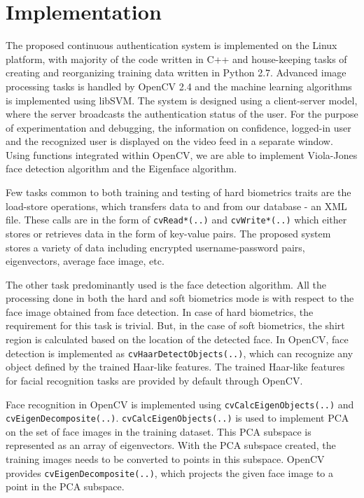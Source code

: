 \documentclass[%
        final,
        internal,
        notitlepage,
        narroweqnarray,
        inline,
        ]{ieee}
\begin{document}
\section{Implementation} \label{sec:implementation}
The proposed continuous authentication system is implemented on the Linux platform, with majority of the code written in C++ and house-keeping tasks of creating and reorganizing training data written in Python 2.7.
Advanced image processing tasks is handled by OpenCV 2.4\cite{opencv} and the machine learning algorithms is implemented using libSVM\cite{libsvm}.
The system is designed using a client-server model, where the server broadcasts the authentication status of the user.
For the purpose of experimentation and debugging, the information on confidence, logged-in user and the recognized user is displayed on the video feed in a separate window.
Using functions integrated within OpenCV, we are able to implement Viola-Jones face detection algorithm and the Eigenface algorithm.

Few tasks common to both training and testing of hard biometrics traits are the load-store operations, which transfers data to and from our database - an XML file.
These calls are in the form of \verb+cvRead*(..)+ and \verb+cvWrite*(..)+ which either stores or retrieves data in the form of key-value pairs.
The proposed system stores a variety of data including encrypted username-password pairs, eigenvectors, average face image, etc. 

The other task predominantly used is the face detection algorithm.
All the processing done in both the hard and soft biometrics mode is with respect to the face image obtained from face detection.
In case of hard biometrics, the requirement for this task is trivial.
But, in the case of soft biometrics, the shirt region is calculated based on the location of the detected face.
In OpenCV, face detection is implemented as \verb+cvHaarDetectObjects(..)+, which can recognize any object defined by the trained Haar-like features.
The trained Haar-like features for facial recognition tasks are provided by default through OpenCV.

Face recognition in OpenCV is implemented using \verb+cvCalcEigenObjects(..)+ and \verb+cvEigenDecomposite(..)+. 
\verb+cvCalcEigenObjects(..)+ is used to implement PCA on the set of face images in the training dataset.
This PCA subspace is represented as an array of eigenvectors.
With the PCA subspace created, the training images needs to be converted to points in this subspace.
OpenCV provides \verb+cvEigenDecomposite(..)+, which projects the given face image to a point in the PCA subspace.
\end{document}
